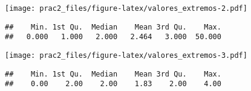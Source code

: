 \documentclass[]{article}
\newenvironment{Shaded}{\begin{snugshade}}{\end{snugshade}}
\newcommand{\DataTypeTok}[1]{\textcolor[rgb]{0.13,0.29,0.53}{#1}}
\newcommand{\KeywordTok}[1]{\textcolor[rgb]{0.13,0.29,0.53}{\textbf{#1}}}
\newcommand{\NormalTok}[1]{#1}
\newcommand{\OperatorTok}[1]{\textcolor[rgb]{0.81,0.36,0.00}{\textbf{#1}}}
\newcommand{\StringTok}[1]{\textcolor[rgb]{0.31,0.60,0.02}{#1}}
\begin{document}
\begin{Shaded}
\end{Shaded}

\texttt{[image: prac2\_files/figure-latex/valores\_extremos-2.pdf]}

\begin{Shaded}
\end{Shaded}

\begin{verbatim}
##    Min. 1st Qu.  Median    Mean 3rd Qu.    Max. 
##   0.000   1.000   2.000   2.464   3.000  50.000
\end{verbatim}

\begin{Shaded}
\end{Shaded}

\texttt{[image: prac2\_files/figure-latex/valores\_extremos-3.pdf]}

\begin{Shaded}
\end{Shaded}

\begin{verbatim}
##    Min. 1st Qu.  Median    Mean 3rd Qu.    Max. 
##    0.00    2.00    2.00    1.83    2.00    4.00
\end{verbatim}

\begin{Shaded}
\end{Shaded}
\end{document}

